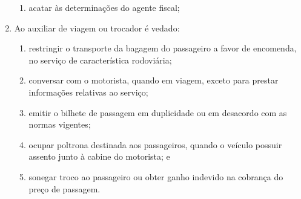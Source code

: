 \begin{enumerate}[resume, label=Art. \arabic*]
\begin{enumerate}[label=\roman*.]
\item acatar às determinações do agente fiscal;

\end{enumerate}

\item Ao auxiliar de viagem ou trocador é vedado:

\begin{enumerate}[label=\roman*.]

\item restringir o transporte da bagagem do passageiro a favor de encomenda, no serviço de característica rodoviária;

\item conversar com o motorista, quando em viagem, exceto para prestar informações relativas ao serviço;

\item emitir o bilhete de passagem em duplicidade ou em desacordo com as normas vigentes;

\item ocupar poltrona destinada aos passageiros, quando o veículo possuir assento junto à cabine do motorista; e

\item sonegar troco ao passageiro ou obter ganho indevido na cobrança do preço de passagem.

\end{enumerate}

\end{enumerate}